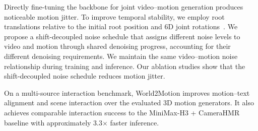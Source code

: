 Directly fine-tuning the backbone for joint video--motion generation produces noticeable motion jitter. To improve temporal stability, we employ root translations relative to the initial root position and 6D joint rotations~\citep{zhao2026ardy}. We propose a shift-decoupled noise schedule that assigns different noise levels to video and motion through shared denoising progress, accounting for their different denoising requirements. We maintain the same video--motion noise relationship during training and inference. Our ablation studies show that the shift-decoupled noise schedule reduces motion jitter.

On a multi-source interaction benchmark, World2Motion improves motion--text alignment and scene interaction over the evaluated 3D motion generators. It also achieves comparable interaction success to the MiniMax-H3 + CameraHMR baseline with approximately 3.3$\times$ faster inference. 

